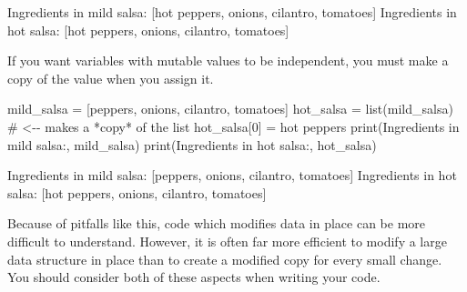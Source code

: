 \documentclass[
  letterpaper,
  DIV=11,
  numbers=noendperiod]{scrartcl}
\newenvironment{Shaded}{\begin{snugshade}}{\end{snugshade}}
\newcommand{\BuiltInTok}[1]{\textcolor[rgb]{0.00,0.23,0.31}{#1}}
\newcommand{\CommentTok}[1]{\textcolor[rgb]{0.37,0.37,0.37}{#1}}
\newcommand{\DecValTok}[1]{\textcolor[rgb]{0.68,0.00,0.00}{#1}}
\newcommand{\NormalTok}[1]{\textcolor[rgb]{0.00,0.23,0.31}{#1}}
\newcommand{\OperatorTok}[1]{\textcolor[rgb]{0.37,0.37,0.37}{#1}}
\newcommand{\StringTok}[1]{\textcolor[rgb]{0.13,0.47,0.30}{#1}}
\theoremstyle{remark}
\begin{document}
\begin{tcolorbox}[enhanced jigsaw, bottomrule=.15mm, rightrule=.15mm, colback=white, colframe=quarto-callout-color-frame, leftrule=.75mm, arc=.35mm, breakable, toprule=.15mm, left=2mm, opacityback=0]
\begin{Shaded}
\begin{Highlighting}[]
\NormalTok{Ingredients in mild salsa: [\textquotesingle{}hot peppers\textquotesingle{}, \textquotesingle{}onions\textquotesingle{}, \textquotesingle{}cilantro\textquotesingle{}, \textquotesingle{}tomatoes\textquotesingle{}]}
\NormalTok{Ingredients in hot salsa: [\textquotesingle{}hot peppers\textquotesingle{}, \textquotesingle{}onions\textquotesingle{}, \textquotesingle{}cilantro\textquotesingle{}, \textquotesingle{}tomatoes\textquotesingle{}]}
\end{Highlighting}
\end{Shaded}

If you want variables with mutable values to be independent, you must
make a copy of the value when you assign it.

\begin{Shaded}
\begin{Highlighting}[]
\NormalTok{mild\_salsa }\OperatorTok{=}\NormalTok{ [}\StringTok{\textquotesingle{}peppers\textquotesingle{}}\NormalTok{, }\StringTok{\textquotesingle{}onions\textquotesingle{}}\NormalTok{, }\StringTok{\textquotesingle{}cilantro\textquotesingle{}}\NormalTok{, }\StringTok{\textquotesingle{}tomatoes\textquotesingle{}}\NormalTok{]}
\NormalTok{hot\_salsa }\OperatorTok{=} \BuiltInTok{list}\NormalTok{(mild\_salsa)        }\CommentTok{\# \textless{}{-}{-} makes a *copy* of the list}
\NormalTok{hot\_salsa[}\DecValTok{0}\NormalTok{] }\OperatorTok{=} \StringTok{\textquotesingle{}hot peppers\textquotesingle{}}
\BuiltInTok{print}\NormalTok{(}\StringTok{\textquotesingle{}Ingredients in mild salsa:\textquotesingle{}}\NormalTok{, mild\_salsa)}
\BuiltInTok{print}\NormalTok{(}\StringTok{\textquotesingle{}Ingredients in hot salsa:\textquotesingle{}}\NormalTok{, hot\_salsa)}
\end{Highlighting}
\end{Shaded}

\begin{Shaded}
\begin{Highlighting}[]
\NormalTok{Ingredients in mild salsa: [\textquotesingle{}peppers\textquotesingle{}, \textquotesingle{}onions\textquotesingle{}, \textquotesingle{}cilantro\textquotesingle{}, \textquotesingle{}tomatoes\textquotesingle{}]}
\NormalTok{Ingredients in hot salsa: [\textquotesingle{}hot peppers\textquotesingle{}, \textquotesingle{}onions\textquotesingle{}, \textquotesingle{}cilantro\textquotesingle{}, \textquotesingle{}tomatoes\textquotesingle{}]}
\end{Highlighting}
\end{Shaded}

Because of pitfalls like this, code which modifies data in place can be
more difficult to understand. However, it is often far more efficient to
modify a large data structure in place than to create a modified copy
for every small change. You should consider both of these aspects when
writing your code.

\end{tcolorbox}
\end{document}
